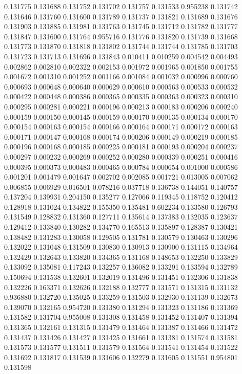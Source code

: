 0.131775
0.131688
0.131752
0.131702
0.131757
0.131533
0.955238
0.131742
0.131646
0.131760
0.131600
0.131789
0.131737
0.131821
0.131689
0.131676
0.131903
0.131885
0.131981
0.131763
0.131745
0.131712
0.131782
0.131777
0.131847
0.131600
0.131764
0.955716
0.131776
0.131820
0.131739
0.131668
0.131773
0.131870
0.131818
0.131802
0.131744
0.131744
0.131785
0.131703
0.131723
0.131713
0.131696
0.131843
0.010411
0.010259
0.004542
0.004493
0.002862
0.002810
0.002322
0.002153
0.001972
0.001965
0.001850
0.001755
0.001672
0.001310
0.001252
0.001166
0.001084
0.001032
0.000996
0.000760
0.000693
0.000648
0.000640
0.000629
0.000610
0.000563
0.000533
0.000532
0.000422
0.000448
0.000386
0.000365
0.000335
0.000363
0.000323
0.000310
0.000295
0.000281
0.000221
0.000196
0.000213
0.000183
0.000206
0.000240
0.000159
0.000150
0.000145
0.000159
0.000170
0.000135
0.000134
0.000170
0.000154
0.000163
0.000154
0.000166
0.000164
0.000171
0.000172
0.000163
0.000171
0.000147
0.000168
0.000174
0.000206
0.000149
0.000219
0.000185
0.000196
0.000168
0.000185
0.000225
0.000181
0.000193
0.000204
0.000237
0.000297
0.000232
0.000269
0.000252
0.000280
0.000339
0.000251
0.000416
0.000395
0.000373
0.000483
0.000465
0.000784
0.000654
0.001000
0.000586
0.001201
0.001479
0.001647
0.002702
0.002085
0.001721
0.013005
0.007062
0.006855
0.006929
0.016501
0.078216
0.037718
0.136738
0.144051
0.140757
0.137204
0.139931
0.204150
0.135277
0.127066
0.119345
0.118752
0.120412
0.128918
0.131024
0.134822
0.155350
0.135481
0.602234
0.133580
0.126793
0.131549
0.128832
0.131360
0.127711
0.135614
0.137383
0.132035
0.123637
0.129412
0.133840
0.130282
0.134770
0.165513
0.135897
0.128387
0.130421
0.138482
0.131283
0.130058
0.129505
0.131781
0.130579
0.130463
0.130296
0.132022
0.131048
0.131509
0.130830
0.130913
0.130900
0.131115
0.134964
0.132429
0.132643
0.133820
0.134365
0.131168
0.148653
0.132250
0.133829
0.133092
0.135081
0.117243
0.132257
0.136082
0.133291
0.133594
0.132789
0.150694
0.131538
0.132601
0.132019
0.131496
0.131451
0.132306
0.131838
0.132226
0.163371
0.132626
0.132188
0.132777
0.131571
0.131315
0.131132
0.936880
0.132720
0.135025
0.133259
0.131503
0.132930
0.131139
0.132673
0.139070
0.132165
0.954720
0.131380
0.131294
0.131323
0.131186
0.131369
0.131582
0.131704
0.955008
0.131308
0.131458
0.131452
0.131407
0.131394
0.131365
0.132161
0.131315
0.131479
0.131464
0.131387
0.131466
0.131472
0.131437
0.131426
0.131427
0.131425
0.131661
0.131381
0.131574
0.131581
0.131573
0.131577
0.131511
0.131579
0.131564
0.131541
0.131454
0.131522
0.131692
0.131817
0.131539
0.131606
0.132279
0.131605
0.131551
0.954801
0.131598
